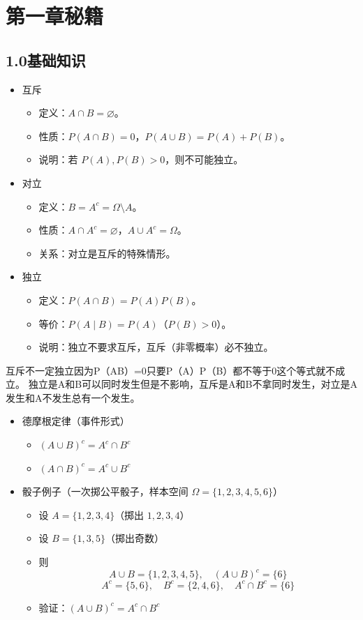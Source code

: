 \chapter{第一章秘籍}
\section*{1.0基础知识}
\begin{itemize}
  \item 互斥
  \begin{itemize}
    \item 定义：$A\cap B=\varnothing$。
    \item 性质：$P(A\cap B)=0$，$P(A\cup B)=P(A)+P(B)$。
    \item 说明：若 $P(A),P(B)>0$，则不可能独立。
  \end{itemize}

  \item 对立
  \begin{itemize}
    \item 定义：$B=A^c=\Omega\setminus A$。
    \item 性质：$A\cap A^c=\varnothing$，$A\cup A^c=\Omega$。
    \item 关系：对立是互斥的特殊情形。
  \end{itemize}

  \item 独立
  \begin{itemize}
    \item 定义：$P(A\cap B)=P(A)P(B)$。
    \item 等价：$P(A\mid B)=P(A)$（$P(B)>0$）。
    \item 说明：独立不要求互斥，互斥（非零概率）必不独立。
  \end{itemize}
\end{itemize}
\begin{dxtips}
    互斥不一定独立因为P（AB）=0只要P（A）P（B）都不等于0这个等式就不成立。
    独立是A和B可以同时发生但是不影响，互斥是A和B不拿同时发生，对立是A发生和A不发生总有一个发生。
\end{dxtips}

\begin{itemize}
  \item 德摩根定律（事件形式）
  \begin{itemize}
    \item $(A\cup B)^c=A^c\cap B^c$
    \item $(A\cap B)^c=A^c\cup B^c$
  \end{itemize}

  \item 骰子例子（一次掷公平骰子，样本空间 $\Omega=\{1,2,3,4,5,6\}$）
  \begin{itemize}
    \item 设 $A=\{1,2,3,4\}$（掷出 $1,2,3,4$）
    \item 设 $B=\{1,3,5\}$（掷出奇数）
    \item 则
    \[
    A\cup B=\{1,2,3,4,5\},\quad (A\cup B)^c=\{6\}
    \]
    \[
    A^c=\{5,6\},\quad B^c=\{2,4,6\},\quad A^c\cap B^c=\{6\}
    \]
    \item 验证：$(A\cup B)^c=A^c\cap B^c$
  \end{itemize}
\end{itemize}

